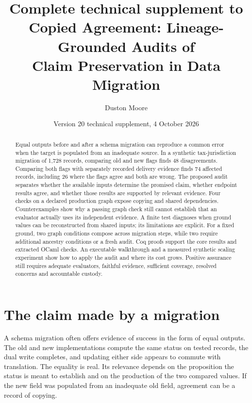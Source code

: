 \documentclass[smallextended,envcountsect,envcountsame,natbib]{svjour3}
\begin{document}
\title{Complete technical supplement to Copied Agreement: Lineage-Grounded Audits of\\ Claim Preservation in Data Migration}
\author{Duston Moore}
\date{Version 20 technical supplement, 4 October 2026}

\maketitle

\begin{abstract}
Equal outputs before and after a schema migration can reproduce a common error when the target is populated from an inadequate source. In a synthetic tax-jurisdiction migration of 1,728 records, comparing old and new flags finds 48 disagreements. Comparing both flags with separately recorded delivery evidence finds 74 affected records, including 26 where the flags agree and both are wrong. The proposed audit separates whether the available inputs determine the promised claim, whether endpoint results agree, and whether those results are supported by relevant evidence. Four checks on a declared production graph expose copying and shared dependencies. Counterexamples show why a passing graph check still cannot establish that an evaluator actually uses its independent evidence. A finite test diagnoses when ground values can be reconstructed from shared inputs; its limitations are explicit. For a fixed ground, two graph conditions compose across migration steps, while two require additional ancestry conditions or a fresh audit. Coq proofs support the core results and extracted OCaml checks. An executable walkthrough and a measured synthetic scaling experiment show how to apply the audit and where its cost grows. Positive assurance still requires adequate evaluators, faithful evidence, sufficient coverage, resolved concerns and accountable custody.
\end{abstract}

\section{The claim made by a migration}\label{ex:sec:intro}
A schema migration often offers evidence of success in the form of equal outputs. The old and new implementations compute the same status on tested records, the dual write completes, and updating either side appears to commute with translation. The equality is real. Its relevance depends on the proposition the status is meant to establish and on the production of the two compared values. If the new field was populated from an inadequate old field, agreement can be a record of copying.
\end{document}
